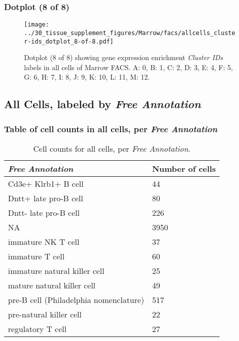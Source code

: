 \clearpage

\subsubsection{Dotplot (8 of 8)}
\begin{figure}[h]
\centering
\texttt{[image: ../30\_tissue\_supplement\_figures/Marrow/facs/allcells\_cluster-ids\_dotplot\_8-of-8.pdf]}

\caption{ Dotplot (8 of 8)  showing gene expression enrichment \emph{Cluster IDs} labels in all cells of Marrow FACS. A: 0, B: 1, C: 2, D: 3, E: 4, F: 5, G: 6, H: 7, I: 8, J: 9, K: 10, L: 11, M: 12.}
\end{figure}


\clearpage

\subsection{All Cells, labeled by \emph{Free Annotation}}
\subsubsection{Table of cell counts in all cells, per \emph{Free Annotation}}\begin{table}[h]
\centering
\label{my-label}
\begin{tabular}{@{}ll@{}}
\toprule

\emph{Free Annotation}& Number of cells \\ \midrule
Cd3e+ Klrb1+ B cell & 44 \\

Dntt+ late pro-B cell & 80 \\

Dntt- late pro-B cell & 226 \\

NA & 3950 \\

immature NK T cell & 37 \\

immature T cell & 60 \\

immature natural killer cell & 25 \\

mature natural killer cell & 49 \\

pre-B cell (Philadelphia nomenclature) & 517 \\

pre-natural killer cell & 22 \\

regulatory T cell & 27 \\
\bottomrule
\end{tabular}
\caption{Cell counts for all cells, per \emph{Free Annotation}.}
\end{table}

